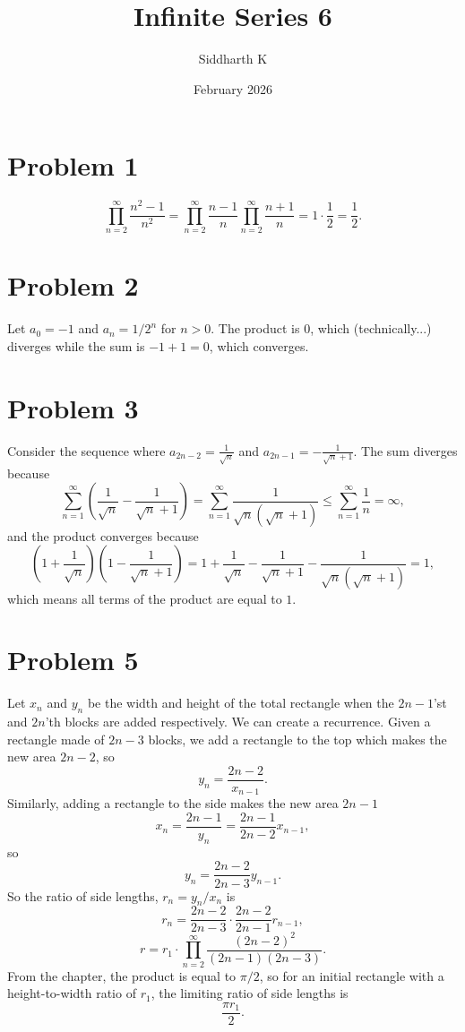 \documentclass{article}
\title{Infinite Series 6}
\author{Siddharth K}
\date{February 2026}
\newcommand{\bigp}[1]{\left(#1\right)}
\newcommand{\summation}[1][0]{\sum_{n=#1}^\infty}
\begin{document}
\maketitle

\section*{Problem 1}
$$\prod_{n=2}^\infty \frac{n^2 - 1}{n^2} = \prod_{n = 2}^\infty \frac{n - 1}{n}\prod_{n=2}^\infty\frac{n + 1}{n} = 1 \cdot \frac 12 = \frac 12.$$

\section*{Problem 2}
Let $a_0 = -1$ and $a_n = 1/2^n$ for $n > 0$. The product is $0$, which (technically...) diverges while the sum is $-1 + 1 = 0$, which converges.

\section*{Problem 3}
Consider the sequence where $a_{2n - 2} = \frac{1}{\sqrt{n}}$ and $a_{2n - 1} = -\frac{1}{\sqrt{n} + 1}$. The sum diverges because
$$\summation[1] \bigp{\frac{1}{\sqrt{n}} - \frac{1}{\sqrt{n} + 1}} = \summation[1] \frac{1}{\sqrt{n}(\sqrt{n} + 1)} \le \summation[1] \frac{1}{n} = \infty,$$
and the product converges because
$$\bigp{1 + \frac{1}{\sqrt{n}}}\bigp{1 - \frac{1}{\sqrt{n} + 1}} = 1 + \frac{1}{\sqrt{n}} - \frac{1}{\sqrt{n} + 1} - \frac{1}{\sqrt{n}(\sqrt{n} + 1)} = 1,$$
which means all terms of the product are equal to $1$.

\section*{Problem 5}
Let $x_n$ and $y_n$ be the width and height of the total rectangle when the $2n - 1$'st and $2n$'th blocks are added respectively. We can create a recurrence. Given a rectangle made of $2n - 3$ blocks, we add a rectangle to the top which makes the new area $2n - 2$, so
$$y_n = \frac{2n - 2}{x_{n - 1}}.$$
Similarly, adding a rectangle to the side makes the new area $2n - 1$
$$x_n = \frac{2n - 1}{y_n} = \frac{2n - 1}{2n - 2}x_{n - 1},$$
so
$$y_n = \frac{2n - 2}{2n - 3}y_{n - 1}.$$
So the ratio of side lengths, $r_n = y_n/x_n$ is
$$r_n = \frac{2n - 2}{2n - 3}\cdot \frac{2n - 2}{2n - 1}r_{n - 1},$$
$$r = r_1\cdot \prod_{n = 2}^\infty \frac{(2n - 2)^2}{(2n - 1)(2n - 3)}.$$
From the chapter, the product is equal to $\pi/2$, so for an initial rectangle with a height-to-width ratio of $r_1$, the limiting ratio of side lengths is
$$\frac{\pi r_1}{2}.$$
\end{document}
